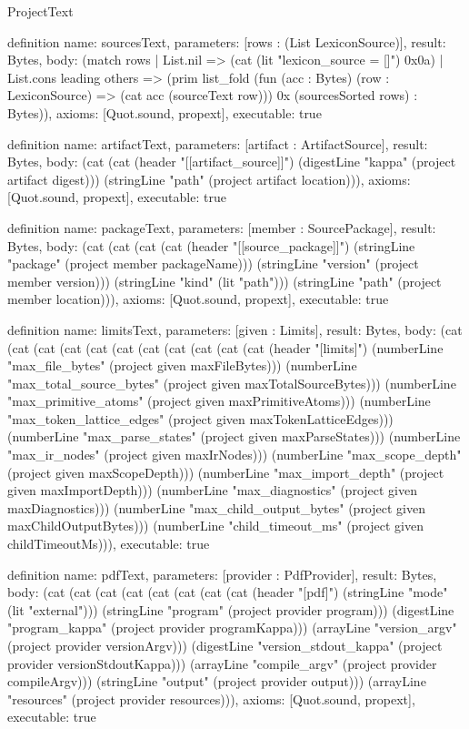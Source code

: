 \begin{lexlean}{ProjectText}
\begin{semanticmodule}
definition{
  name: sourcesText,
  parameters: [rows : (List LexiconSource)],
  result: Bytes,
  body: (match rows
    | List.nil => (cat (lit "lexicon_source = []") 0x0a)
    | List.cons leading others => (prim list_fold (fun (acc : Bytes) (row : LexiconSource) => (cat acc (sourceText row))) 0x (sourcesSorted rows) : Bytes)),
  axioms: [Quot.sound, propext],
  executable: true
}

definition{
  name: artifactText,
  parameters: [artifact : ArtifactSource],
  result: Bytes,
  body: (cat (cat (header "[[artifact_source]]") (digestLine "kappa" (project artifact digest))) (stringLine "path" (project artifact location))),
  axioms: [Quot.sound, propext],
  executable: true
}

definition{
  name: packageText,
  parameters: [member : SourcePackage],
  result: Bytes,
  body: (cat (cat (cat (cat (header "[[source_package]]") (stringLine "package" (project member packageName))) (stringLine "version" (project member version))) (stringLine "kind" (lit "path"))) (stringLine "path" (project member location))),
  axioms: [Quot.sound, propext],
  executable: true
}

definition{
  name: limitsText,
  parameters: [given : Limits],
  result: Bytes,
  body: (cat (cat (cat (cat (cat (cat (cat (cat (cat (cat (cat (header "[limits]") (numberLine "max_file_bytes" (project given maxFileBytes))) (numberLine "max_total_source_bytes" (project given maxTotalSourceBytes))) (numberLine "max_primitive_atoms" (project given maxPrimitiveAtoms))) (numberLine "max_token_lattice_edges" (project given maxTokenLatticeEdges))) (numberLine "max_parse_states" (project given maxParseStates))) (numberLine "max_ir_nodes" (project given maxIrNodes))) (numberLine "max_scope_depth" (project given maxScopeDepth))) (numberLine "max_import_depth" (project given maxImportDepth))) (numberLine "max_diagnostics" (project given maxDiagnostics))) (numberLine "max_child_output_bytes" (project given maxChildOutputBytes))) (numberLine "child_timeout_ms" (project given childTimeoutMs))),
  executable: true
}

definition{
  name: pdfText,
  parameters: [provider : PdfProvider],
  result: Bytes,
  body: (cat (cat (cat (cat (cat (cat (cat (cat (header "[pdf]") (stringLine "mode" (lit "external"))) (stringLine "program" (project provider program))) (digestLine "program_kappa" (project provider programKappa))) (arrayLine "version_argv" (project provider versionArgv))) (digestLine "version_stdout_kappa" (project provider versionStdoutKappa))) (arrayLine "compile_argv" (project provider compileArgv))) (stringLine "output" (project provider output))) (arrayLine "resources" (project provider resources))),
  axioms: [Quot.sound, propext],
  executable: true
}


\end{semanticmodule}
\end{lexlean}
